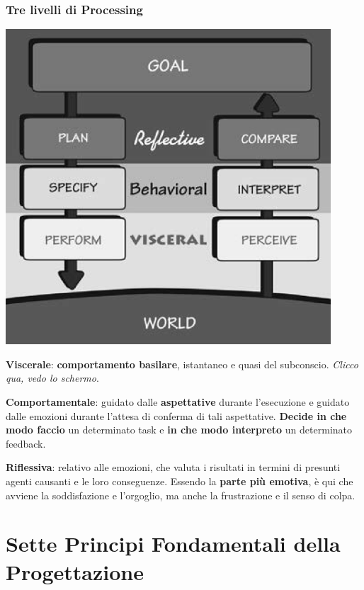 \documentclass[10pt]{article}
\begin{document}
\subsubsection{Tre livelli di Processing}
\begin{multicols}{2}
\includegraphics[scale=0.5]{treprocessing.png}

\begin{list}{}{Gli stati dell'azione possono essere associati con tre livelli di processing mentale:}
\item \textbf{Viscerale}: \textbf{comportamento basilare}, istantaneo e quasi del subconscio. \textit{Clicco qua, vedo lo schermo}.
\item \textbf{Comportamentale}: guidato dalle \textbf{aspettative} durante l'esecuzione e guidato dalle emozioni durante l'attesa di conferma di tali aspettative. \textbf{Decide in che modo faccio} un determinato task e \textbf{in che modo interpreto} un determinato feedback.
\item \textbf{Riflessiva}: relativo alle emozioni, che valuta i risultati in termini di presunti agenti causanti e le loro conseguenze. Essendo la \textbf{parte più emotiva}, è qui che avviene la soddisfazione e l'orgoglio, ma anche la frustrazione e il senso di colpa.
\end{list}
\end{multicols}
\section{Sette Principi Fondamentali della Progettazione}
\end{document}
